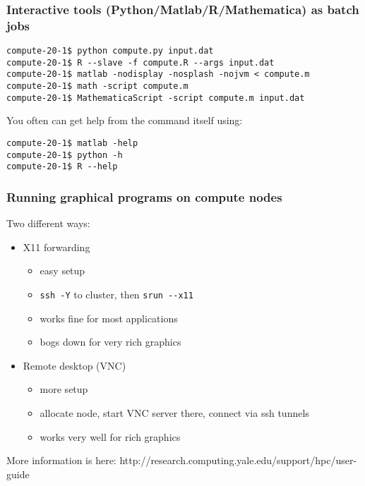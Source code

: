 \documentclass[10pt]{beamer}
\begin{document}
\begin{frame}[fragile]
\frametitle{Interactive tools (Python/Matlab/R/Mathematica) as batch jobs}

\begin{verbatim}
compute-20-1$ python compute.py input.dat
compute-20-1$ R --slave -f compute.R --args input.dat
compute-20-1$ matlab -nodisplay -nosplash -nojvm < compute.m
compute-20-1$ math -script compute.m
compute-20-1$ MathematicaScript -script compute.m input.dat
\end{verbatim}

You often can get help from the command itself using:

\begin{verbatim}
compute-20-1$ matlab -help
compute-20-1$ python -h
compute-20-1$ R --help
\end{verbatim}
\end{frame}

\begin{frame}[fragile]
\frametitle{Running graphical programs on compute nodes}
Two different ways:
\begin{itemize}
\item X11 forwarding
\begin{itemize}
\item easy setup
\item \verb+ssh -Y+ to cluster, then \verb+srun --x11+
\item works fine for most applications
\item bogs down for very rich graphics
\end{itemize}
\item Remote desktop (VNC)
\begin{itemize}
\item more setup
\item allocate node, start VNC server there, connect via ssh tunnels
\item works very well for rich graphics
\end{itemize}
\end{itemize}

More information is here:
http://research.computing.yale.edu/support/hpc/user-guide

\end{frame}
\end{document}
